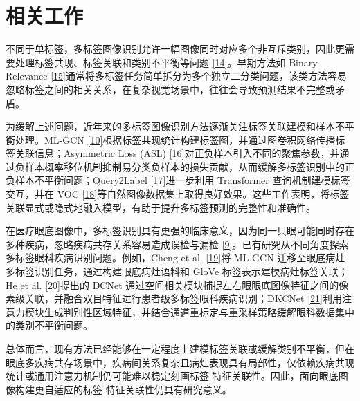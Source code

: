 \section{相关工作}\label{ux76f8ux5173ux5de5ux4f5c}

\label{a.ux591aux6807ux7b7eux56feux50cfux8bc6ux522b}

不同于单标签，多标签图像识别允许一幅图像同时对应多个非互斥类别，因此更需要处理标签共现、标签关联和类别不平衡等问题 \hyperref[_Ref213949872]{{[}14{]}}。早期方法如 Binary Relevance \hyperref[_Ref213949896]{{[}15{]}}通常将多标签任务简单拆分为多个独立二分类问题，该类方法容易忽略标签之间的相关关系，在复杂视觉场景中，往往会导致预测结果不完整或矛盾。

为缓解上述问题，近年来的多标签图像识别方法逐渐关注标签关联建模和样本不平衡处理。ML-GCN \hyperref[_Ref213949382]{{[}10{]}}根据标签共现统计构建标签图，并通过图卷积网络传播标签关联信息；Asymmetric Loss (ASL) \hyperref[_Ref213949927]{{[}16{]}}对正负样本引入不同的聚焦参数，并通过负样本概率移位机制抑制易分类负样本的损失贡献，从而缓解多标签识别中的正负样本不平衡问题；Query2Label \hyperref[_Ref213950246]{{[}17{]}}进一步利用 Transformer 查询机制建模标签交互，并在 VOC \hyperref[_Ref213950282]{{[}18{]}}等自然图像数据集上取得良好效果。这些工作表明，将标签关联显式或隐式地融入模型，有助于提升多标签预测的完整性和准确性。

在医疗眼底图像中，多标签识别具有更强的临床意义，因为同一只眼可能同时存在多种疾病，忽略疾病共存关系容易造成误检与漏检 \hyperref[_Ref213949362]{{[}9{]}}。已有研究从不同角度探索多标签眼科疾病识别问题。例如，Cheng et al. \hyperref[_Ref213950349]{{[}19{]}}将 ML-GCN 迁移至眼底病灶多标签识别任务，通过构建眼底病灶语料和 GloVe 标签表示建模病灶标签关联；He et al. \hyperref[_Ref213950338]{{[}20{]}}提出的 DCNet 通过空间相关模块捕捉左右眼眼底图像特征之间的像素级关联，并融合双目特征进行患者级多标签眼科疾病识别；DKCNet \hyperref[_Ref213950343]{{[}21{]}}利用注意力模块生成判别性区域特征，并结合通道重标定与重采样策略缓解眼科数据集中的类别不平衡问题。

总体而言，现有方法已经能够在一定程度上建模标签关联或缓解类别不平衡，但在眼底多疾病共存场景中，疾病间关系复杂且病灶表现具有局部性，仅依赖疾病共现统计或通用注意力机制仍可能难以稳定刻画标签-特征关联性。因此，面向眼底图像构建更自适应的标签-特征关联性仍具有研究意义。

\label{b.ux57dfux9002ux5e94ux57dfux6cdbux5316ux4e0eux5355ux57dfux6cdbux5316}


